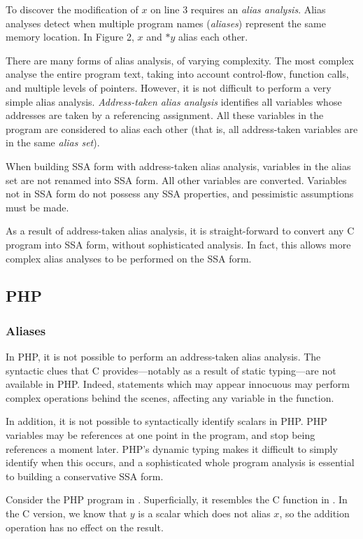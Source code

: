 To discover the modification of $x$ on line 3 requires an \textit{alias analysis}.
Alias analyses detect when multiple program names (\textit{aliases}) represent the same memory location.
In Figure 2, $x$ and $*y$ alias each other.

There are many forms of alias analysis, of varying complexity.
The most complex analyse the entire program text, taking into account control-flow, function calls, and multiple levels of pointers.
However, it is not difficult to perform a very simple alias analysis.
\textit{Address-taken alias analysis} identifies all variables whose addresses are taken by a referencing assignment.
All these variables in the program are considered to alias each other (that is, all address-taken variables are in the same \textit{alias set}).

When building SSA form with address-taken alias analysis, variables in the alias set are not renamed into SSA form.
All other variables are converted.
Variables not in SSA form do not possess any SSA properties, and pessimistic assumptions must be made.

As a result of address-taken alias analysis, it is straight-forward to convert any C program into SSA form, without sophisticated analysis.
In fact, this allows more complex alias analyses to be performed on the SSA form.

\subsection{PHP}

\subsubsection{Aliases}

In PHP, it is not possible to perform an address-taken alias analysis.
The syntactic clues that C provides---notably as a result of static typing---are not available in PHP.
Indeed, statements which may appear innocuous may perform complex operations behind the scenes, affecting any variable in the function.

In addition, it is not possible to syntactically identify scalars in PHP.
PHP variables may be references at one point in the program, and stop being references a moment later.
PHP's dynamic typing makes it difficult to simply identify when this occurs, and a sophisticated whole program analysis is essential to building a conservative SSA form.

Consider the PHP program in .
Superficially, it resembles the C function in .
In the C version, we know that $y$ is a scalar which does not alias $x$, so the addition operation has no effect on the result.


